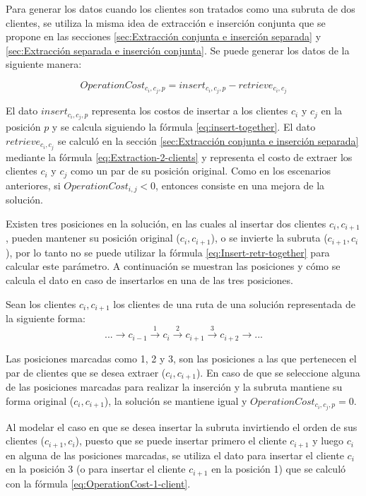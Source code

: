\documentclass[12pt]{report}
\begin{document}
	Para generar los datos cuando los clientes son tratados como una subruta de dos clientes, se utiliza la misma idea de extracción e inserción conjunta que se propone en las secciones \ref{sec:Extracción conjunta e inserción separada} y \ref{sec:Extracción separada e inserción conjunta}. Se puede generar los datos de la siguiente manera:

	\begin{equation}
		OperationCost_{c_i,c_j,p} = insert_{c_i,c_j,p} - retrieve_{c_i,c_j}
		\label{eq:Insert-retr-together}
	\end{equation}

	El dato $insert_{c_i,c_j,p}$ representa los costos de insertar a los clientes $c_i$ y $c_j$ en la posición $p$  y se calcula siguiendo la fórmula \ref{eq:insert-together}. El dato $retrieve_{c_i,c_j}$ se calculó en la sección \ref{sec:Extracción conjunta e inserción separada} mediante la fórmula \ref{eq:Extraction-2-clients} y representa el costo de extraer los clientes $c_i$ y $c_j$ como un par de su posición original.
	Como en los escenarios anteriores, si $OperationCost_{i,j} < 0$, entonces consiste en una mejora de la solución.

	Existen tres posiciones en la solución, en las cuales al insertar dos clientes $c_i,c_{i+1}$, pueden mantener su posición original ($c_i,c_{i+1}$), o se invierte la subruta ($c_{i+1},c_i$), por lo tanto no se puede utilizar la fórmula \ref{eq:Insert-retr-together} para calcular este parámetro. A continuación se muestran las posiciones y cómo se calcula el dato en caso de insertarlos en una de las tres posiciones.

	Sean los clientes $c_i,c_{i+1}$ los clientes de una ruta de una solución representada de la siguiente forma:
	\[
	... \rightarrow c_{i-1} \xrightarrow{1} c_i \xrightarrow{2} c_{i+1} \xrightarrow{3} c_{i+2} \rightarrow ...
	\]

	Las posiciones marcadas como 1, 2 y 3, son las posiciones a las que pertenecen el par de clientes que se desea extraer ($c_i,c_{i+1}$). En caso de que se seleccione alguna de las posiciones marcadas para realizar la inserción y la subruta mantiene su forma original ($c_i,c_{i+1}$), la solución se mantiene igual y $OperationCost_{c_i,c_j,p} = 0$.

	Al modelar el caso en que se desea insertar la subruta invirtiendo el orden de sus clientes ($c_{i+1},c_i$), puesto que se puede insertar primero el cliente $c_{i+1}$ y luego $c_i$ en alguna de las posiciones marcadas, se utiliza el dato para insertar el cliente $c_i$ en la posición 3 (o para insertar el cliente $c_{i+1}$ en la posición 1) que se calculó con la fórmula \ref{eq:OperationCost-1-client}.
\end{document}
